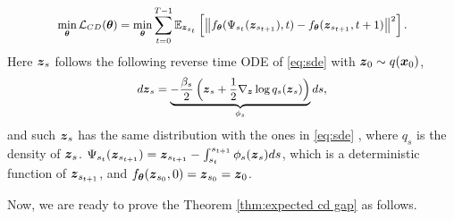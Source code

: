 \begin{equation}\label{eq:cd objective expected}
    \small
    \min_{\boldsymbol{\theta}}\mathcal{L}_{CD}(\boldsymbol{\theta}) = \min_{\boldsymbol{\theta}}\sum_{t = 0}^{T - 1}\mathbb{E}_{\boldsymbol{z}_{s_{t}}}\left[\left\|f_{\boldsymbol{\theta}}(\Psi_{s_{t}}(\boldsymbol{z}_{s_{t + 1}}), t) - f_{\boldsymbol{\theta}}(\boldsymbol{z}_{s_{t + 1}}, t + 1)\right\|^{2}\right].
\end{equation}
Here $\boldsymbol{z}_{s}$ follows the following reverse time ODE of \eqref{eq:sde} with $\boldsymbol{z}_{0}\sim q(\boldsymbol{x}_{0})$,
\begin{equation}
    \small
        d\boldsymbol{z}_{s} = \underbrace{-\frac{\beta_{s}}{2}\left(\boldsymbol{z}_{s} + \frac{1}{2}\nabla_{\boldsymbol{z}}\log{q_{s}(\boldsymbol{z}_{s})}\right)}_{\phi_{s}}ds,  
\end{equation}
and such $\boldsymbol{z}_{s}$ has the same distribution with the ones in \eqref{eq:sde} \citep{song2020denoising}, where $q_{s}$ is the density of $\boldsymbol{z}_{s}$. $\Psi_{s_{t}}(\boldsymbol{z}_{s_{t + 1}}) = \boldsymbol{z}_{s_{t + 1}} - \int_{s_{t}}^{s_{t + 1}} \phi_{s}(\boldsymbol{z}_{s})ds$, which is a deterministic function of $\boldsymbol{z}_{s_{t + 1}}$, and $f_{\boldsymbol{\theta}}(\boldsymbol{z}_{s_{0}}, 0) = \boldsymbol{z}_{s_{0}} = \boldsymbol{z}_{0}$. 
\par
Now, we are ready to prove the Theorem \ref{thm:expected cd gap} as follows. 


